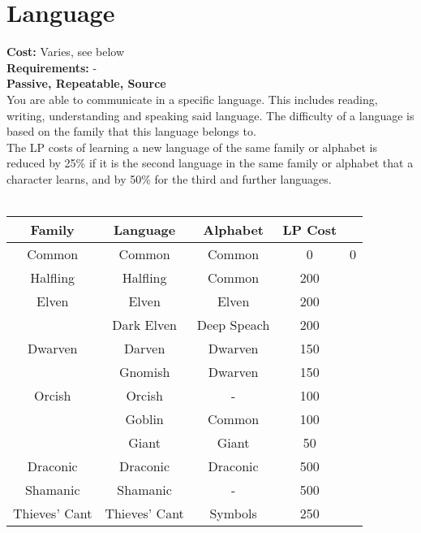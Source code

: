 \section{Language}\label{sec:language}
\textbf{Cost:} Varies, see below\\
\textbf{Requirements:} -\\
\textbf{Passive, Repeatable, Source}\\
You are able to communicate in a specific language.
This includes reading, writing, understanding and speaking said language.
The difficulty of a language is based on the family that this language belongs to.\\
The LP costs of learning a new language of the same family or alphabet is reduced by 25\% if it is the second language in the same family or alphabet that a character learns, and by 50\% for the third and further languages.\\
\\

\begin{longtable}{c | c | c | c | c}
	Family & Language & Alphabet & LP Cost\\
	\hline
	Common & Common & Common & 0 & 0\\
	\cline{2-5}
	Halfling & Halfling & Common & 200\\
	Elven & Elven & Elven & 200\\
	& Dark Elven & Deep Speach & 200\\
	Dwarven & Darven & Dwarven & 150\\
	& Gnomish & Dwarven & 150\\
	Orcish & Orcish & - & 100\\
	& Goblin & Common & 100\\
	& Giant & Giant & 50\\
	Draconic & Draconic & Draconic & 500\\
	Shamanic & Shamanic & - & 500\\
	Thieves' Cant & Thieves' Cant & Symbols & 250\\
\end{longtable}